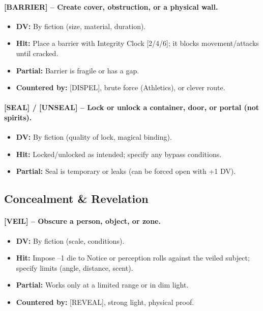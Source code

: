 \paragraph{[BARRIER] – Create cover, obstruction, or a physical wall.}
\begin{itemize}
  \item \textbf{DV:} By fiction (size, material, duration).
  \item \textbf{Hit:} Place a barrier with Integrity Clock [2/4/6]; it blocks movement/attacks until cracked.
  \item \textbf{Partial:} Barrier is fragile or has a gap.
  \item \textbf{Countered by:} [DISPEL], brute force (Athletics), or clever route.
\end{itemize}

\paragraph{[SEAL] / [UNSEAL] – Lock or unlock a container, door, or portal (not spirits).}
\begin{itemize}
  \item \textbf{DV:} By fiction (quality of lock, magical binding).
  \item \textbf{Hit:} Locked/unlocked as intended; specify any bypass conditions.
  \item \textbf{Partial:} Seal is temporary or leaks (can be forced open with +1 DV).
\end{itemize}

\subsection{Concealment \& Revelation}

\paragraph{[VEIL] – Obscure a person, object, or zone.}
\begin{itemize}
  \item \textbf{DV:} By fiction (scale, conditions).
  \item \textbf{Hit:} Impose –1 die to Notice or perception rolls against the veiled subject; specify limits (angle, distance, scent).
  \item \textbf{Partial:} Works only at a limited range or in dim light.
  \item \textbf{Countered by:} [REVEAL], strong light, physical proof.
\end{itemize}

